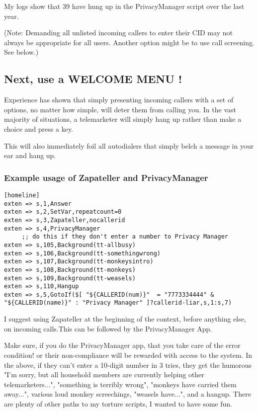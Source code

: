 My logs show that 39 have hung up in the PrivacyManager script over
the last year.

(Note: Demanding all unlisted incoming callers to enter their CID may
not always be appropriate for all users. Another option might be to
use call screening. See below.)


\subsection{Next, use a WELCOME MENU !}

Experience has shown that simply presenting incoming callers with
a set of options, no matter how simple, will deter them from calling
you. In the vast majority of situations, a telemarketer will simply
hang up rather than make a choice and press a key.

This will also immediately foil all autodialers that simply belch a
message in your ear and hang up.

\subsubsection{Example usage of Zapateller and PrivacyManager}

\begin{astlisting}
\begin{verbatim}
[homeline]
exten => s,1,Answer
exten => s,2,SetVar,repeatcount=0
exten => s,3,Zapateller,nocallerid
exten => s,4,PrivacyManager
     ;; do this if they don't enter a number to Privacy Manager
exten => s,105,Background(tt-allbusy)
exten => s,106,Background(tt-somethingwrong)
exten => s,107,Background(tt-monkeysintro)
exten => s,108,Background(tt-monkeys)
exten => s,109,Background(tt-weasels)
exten => s,110,Hangup
exten => s,5,GotoIf($[ "${CALLERID(num)}"  = "7773334444" & "${CALLERID(name)}" : "Privacy Manager" ]?callerid-liar,s,1:s,7)
\end{verbatim}
\end{astlisting}

I suggest using Zapateller at the beginning of the context, before
anything else, on incoming calls.This can be followed by the
PrivacyManager App.

Make sure, if you do the PrivacyManager app, that you take care of the
error condition! or their non-compliance will be rewarded with access
to the system. In the above, if they can't enter a 10-digit number in
3 tries, they get the humorous "I'm sorry, but all household members
are currently helping other telemarketers...", "something is terribly
wrong", "monkeys have carried them away...", various loud monkey
screechings, "weasels have...", and a hangup. There are plenty of
other paths to my torture scripts, I wanted to have some fun.

